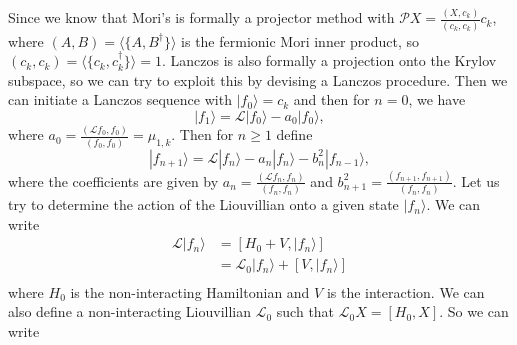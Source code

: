 Since we know that Mori's is formally a projector method with $\mathcal{P}X = \frac{(X,c_k)}{(c_k,c_k)} c_k$, where $(A,B) = \langle \{A, B^\dagger\} \rangle$ is the fermionic Mori inner product, so $(c_k, c_k) = \langle \{c_k, c_k^\dagger\} \rangle = 1$. Lanczos is also formally a projection onto the Krylov subspace, so we can try to exploit this by devising a Lanczos procedure. Then we can initiate a Lanczos sequence with $|f_0\rangle = c_k$ and then for $n=0$, we have
\begin{equation}
|f_1\rangle = \mathcal{L} |f_0\rangle - a_0 |f_0\rangle ,
\end{equation}
where $a_0 = \frac{(\mathcal{L} f_0, f_0)}{(f_0, f_0)} = \mu_{1,k}$. Then for 
$n \geq 1$ define
\begin{equation}
|f_{n+1}\rangle = \mathcal{L} |f_n\rangle - a_n |f_n\rangle - b_n^2 |f_{n-1}\rangle ,
\end{equation}
where the coefficients are given by $a_n = \frac{(\mathcal{L} f_n, f_n)}{(f_n, f_n)}$ and $b_{n+1}^2 = \frac{(f_{n+1}, f_{n+1})}{(f_n, f_n)}$. Let us try to determine the action of the Liouvillian onto a given state $|f_n\rangle$. We can write
\begin{align}
\mathcal{L} |f_n\rangle &= [H_0 + V, |f_n\rangle] \\
&= \mathcal{L}_0 |f_n\rangle + [V, |f_n\rangle] \\
\end{align}
where $H_0$ is the non-interacting Hamiltonian and $V$ is the interaction. We can also define a non-interacting Liouvillian $\mathcal{L}_0$ such that $\mathcal{L}_0 X = [H_0, X]$. So we can write
